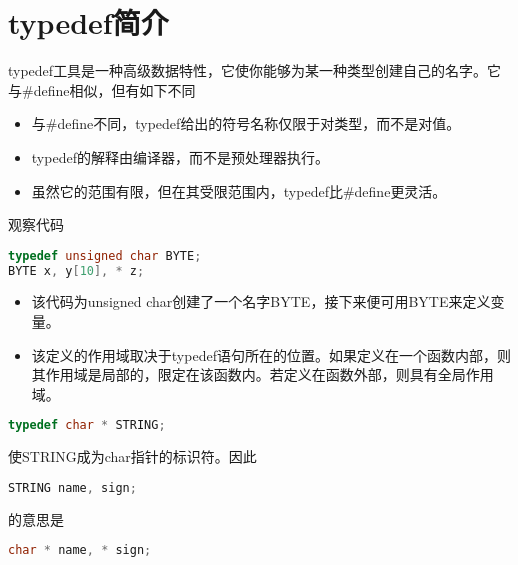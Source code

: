 \section{typedef简介}

\begin{frame}[fragile]\ft{\secname}
{\tf typedef}工具是一种高级数据特性，它使你能够为某一种类型创建自己的名字。它与{\tf \#define}相似，但有如下不同
\begin{itemize}
\item 与{\tf \#define}不同，{\tf typedef}给出的符号名称仅限于对类型，而不是对值。\\[0.1in]
\item {\tf typedef}的解释由编译器，而不是预处理器执行。\\[0.1in]
\item 虽然它的范围有限，但在其受限范围内，{\tf typedef}比{\tf \#define}更灵活。
\end{itemize}
\end{frame}

\begin{frame}[fragile]\ft{\secname}
观察代码
  \begin{lstlisting}[language=c,backgroundcolor=\color{red!20}]
typedef unsigned char BYTE;
BYTE x, y[10], * z;
  \end{lstlisting}
  \begin{itemize}
  \item 该代码为{\tf unsigned char}创建了一个名字{\tf BYTE}，接下来便可用{\tf BYTE}来定义变量。
  \item 该定义的作用域取决于{\tf typedef}语句所在的位置。如果定义在一个函数内部，则其作用域是局部的，限定在该函数内。若定义在函数外部，则具有全局作用域。
  \end{itemize}
\end{frame}

\begin{frame}[fragile]\ft{\secname}
  \begin{lstlisting}[language=c,backgroundcolor=\color{red!20}]
typedef char * STRING;
  \end{lstlisting}
使{\tf STRING}成为{\tf char}指针的标识符。因此
  \begin{lstlisting}[language=c,backgroundcolor=\color{red!20}]
STRING name, sign;
  \end{lstlisting}
的意思是
  \begin{lstlisting}[language=c,backgroundcolor=\color{red!20}]
char * name, * sign;
  \end{lstlisting} 
\end{frame}

